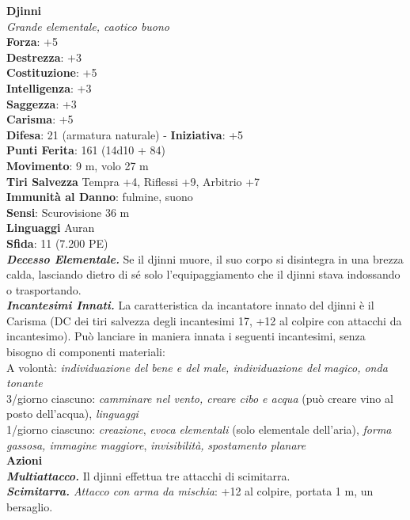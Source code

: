 \begin{multicols}{2}
\medskip\textbf{Djinni}\\
\emph{Grande elementale, caotico buono}\\
\textbf{Forza}: +5\\
\textbf{Destrezza}: +3\\
\textbf{Costituzione}: +5\\
\textbf{Intelligenza}: +3\\
\textbf{Saggezza}: +3\\
\textbf{Carisma}: +5\\
\textbf{Difesa}: 21 (armatura naturale) - \textbf{Iniziativa}: +5\\
\textbf{Punti Ferita}: 161 (14d10 + 84)\\
\textbf{Movimento}: 9 m, volo 27 m\\
\textbf{Tiri Salvezza} Tempra +4, Riflessi +9, Arbitrio +7\\
\textbf{Immunità al Danno}: fulmine, suono\\
\textbf{Sensi}: Scurovisione 36 m\\
\textbf{Linguaggi} Auran\\
\textbf{Sfida}: 11 (7.200 PE)\smallskip\\
\emph{\textbf{Decesso Elementale.}} Se il djinni muore, il suo corpo si disintegra in una brezza calda, lasciando dietro di sé solo l'equipaggiamento che il djinni stava indossando o trasportando.\\
\emph{\textbf{Incantesimi Innati.}} La caratteristica da incantatore innato del djinni è il Carisma (DC dei tiri salvezza degli incantesimi 17, +12 al colpire con attacchi da incantesimo). Può lanciare in maniera innata i seguenti incantesimi, senza bisogno di componenti materiali: \\
A volontà: \emph{individuazione del bene e del male, individuazione del} \emph{magico, onda tonante}\\
3/giorno ciascuno: \emph{camminare nel vento, creare cibo e acqua} (può creare vino al posto dell'acqua), \emph{linguaggi}\\
1/giorno ciascuno: \emph{creazione}, \emph{evoca elementali} (solo elementale dell'aria), \emph{forma gassosa, immagine maggiore}, \emph{invisibilità,} \emph{spostamento planare}\\
\smallskip\textbf{Azioni}\\
\emph{\textbf{Multiattacco.}} Il djinni effettua tre attacchi di scimitarra.\\
\emph{\textbf{Scimitarra.} Attacco con arma da mischia}: +12 al colpire, portata 1 m, un bersaglio.\\

\end{multicols}

